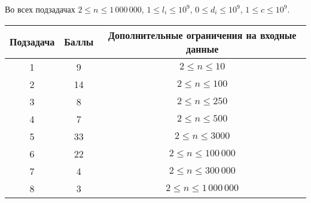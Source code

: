 Во всех подзадачах $2 \le n \le 1\,000\,000$, $1 \le l_i \le 10^9$, $0 \le d_i \le 10^9$, $1 \le c \le 10^9$.

\begin{center}
\renewcommand{\arraystretch}{1.5}
\begin{tabular}{|c|c|c|}
\hline
Подзадача & Баллы & Дополнительные ограничения на входные данные\\
\hline
1 & 9 & $2 \le n \le 10$ \\
\hline
2 & 14 & $2 \le n \le 100$ \\
\hline
3 & 8 & $2 \le n \le 250$ \\
\hline
4 & 7 & $2 \le n \le 500$ \\
\hline
5 & 33 & $2 \le n \le 3000$ \\
\hline
6 & 22 & $2 \le n \le 100\,000$ \\
\hline
7 & 4 & $2 \le n \le 300\,000$ \\
\hline
8 & 3 & $2 \le n \le 1\,000\,000$ \\
\hline
\end{tabular}
\end{center}